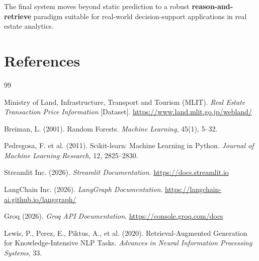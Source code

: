 \documentclass[12pt,a4paper]{article}
\begin{document}
The final system moves beyond static prediction to a robust \textbf{reason-and-retrieve} paradigm suitable for real-world decision-support applications in real estate analytics.

\section*{References}

\begin{thebibliography}{99}

Ministry of Land, Infrastructure, Transport and Tourism (MLIT).
\textit{Real Estate Transaction Price Information} [Dataset].
\url{https://www.land.mlit.go.jp/webland/}

Breiman, L. (2001).
Random Forests.
\textit{Machine Learning}, 45(1), 5--32.

Pedregosa, F. et al. (2011).
Scikit-learn: Machine Learning in Python.
\textit{Journal of Machine Learning Research}, 12, 2825--2830.

Streamlit Inc. (2026).
\textit{Streamlit Documentation}.
\url{https://docs.streamlit.io}

LangChain Inc. (2026).
\textit{LangGraph Documentation}.
\url{https://langchain-ai.github.io/langgraph/}

Groq (2026).
\textit{Groq API Documentation}.
\url{https://console.groq.com/docs}

Lewis, P., Perez, E., Piktus, A., et al. (2020).
Retrieval-Augmented Generation for Knowledge-Intensive NLP Tasks.
\textit{Advances in Neural Information Processing Systems}, 33.

\end{thebibliography}
\end{document}
